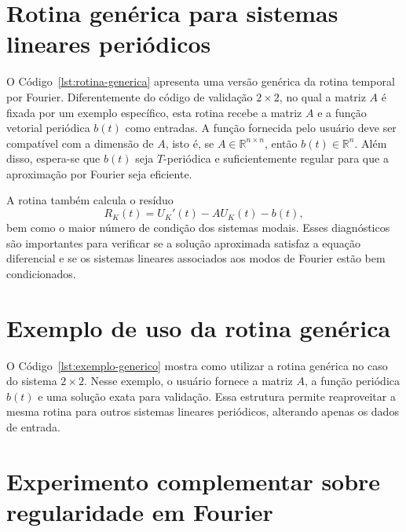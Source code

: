 \section{Rotina genérica para sistemas lineares periódicos}

O Código~\ref{lst:rotina-generica} apresenta uma versão genérica da rotina temporal por Fourier. Diferentemente do código de validação \(2\times2\), no qual a matriz \(A\) é fixada por um exemplo específico, esta rotina recebe a matriz \(A\) e a função vetorial periódica \(b(t)\) como entradas. A função fornecida pelo usuário deve ser compatível com a dimensão de \(A\), isto é, se \(A\in\mathbb{R}^{n\times n}\), então \(b(t)\in\mathbb{R}^n\). Além disso, espera-se que \(b(t)\) seja \(T\)-periódica e suficientemente regular para que a aproximação por Fourier seja eficiente.

A rotina também calcula o resíduo
\[
R_K(t)=U_K'(t)-AU_K(t)-b(t),
\]
bem como o maior número de condição dos sistemas modais. Esses diagnósticos são importantes para verificar se a solução aproximada satisfaz a equação diferencial e se os sistemas lineares associados aos modos de Fourier estão bem condicionados.



\section{Exemplo de uso da rotina genérica}

O Código~\ref{lst:exemplo-generico} mostra como utilizar a rotina genérica no caso do sistema \(2\times2\). Nesse exemplo, o usuário fornece a matriz \(A\), a função periódica \(b(t)\) e uma solução exata para validação. Essa estrutura permite reaproveitar a mesma rotina para outros sistemas lineares periódicos, alterando apenas os dados de entrada.




\section{Experimento complementar sobre regularidade em Fourier}

